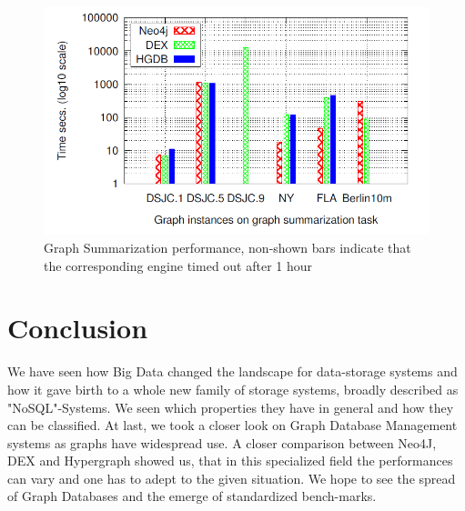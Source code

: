 \documentclass{acm_proc_article-sp}
\begin{document}
\begin{figure}[hbtp]
	\centering
	\includegraphics[scale=0.32]{summarization.png}
	\caption{Graph Summarization performance, non-shown bars indicate that
		the corresponding engine timed out after 1 hour\cite{comparision}}
\end{figure}

\section{Conclusion}

We have seen how Big Data changed the landscape for data-storage systems and how it gave birth to a whole new family of storage systems, broadly described as "NoSQL"-Systems. We seen which properties they have in general and how they can be classified. At last, we took a closer look on Graph Database Management systems as graphs have widespread use. A closer comparison between Neo4J, DEX and Hypergraph showed us, that in this specialized field the performances can vary and one has to adept to the given situation. We hope to see the spread of Graph Databases and the emerge of standardized bench-marks.


%

%
%
\end{document}
